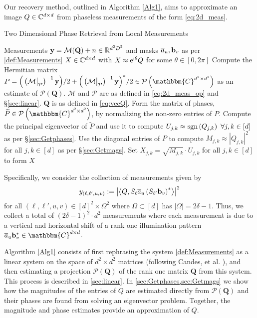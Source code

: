 Our recovery method, outlined in Algorithm \ref{Alg1}, aims to approximate an image $Q\in \mathbb{C}^{d\times d}$ from phaseless measurements of the form \eqref{eq:2d_meas}.
%
%
\begin{algorithm}[htbp]
\renewcommand{\algorithmicrequire}{\textbf{Input:}}
\renewcommand{\algorithmicensure}{\textbf{Output:}}
\caption{Two Dimensional Phase Retrieval from Local Measurements}
\label{Alg1}
\label{alg:2d_pr}
\begin{algorithmic}[1]
    \REQUIRE Measurements $\mathbf{y} = \mathcal{M}(\mathbf{Q}) + n \in \mathbb{R}^{d^2 D^2}$ and masks $\overline{a}_u, \mathbf b_v$ as per \eqref{def:Measurements}
    \ENSURE $X \in \mathbb{C}^{d \times d}$ with $X \approx \mathrm{e}^{\mathrm{i} \theta} Q$ for some $\theta \in [0, 2 \pi]$ 
    \STATE Compute the Hermitian matrix $P = \Big( \left(\mathcal{M} \big|_{\mathcal{P}}\right)^{-1} {\bf y}\Big)/2 + \Big( \left(\Mc \big|_{\mathcal{P}}\right)^{-1} {\bf y}\Big)^*/2  \in \mathcal{P}\left(\mathbbm{C}^{d^2\times d^2}\right)$ as an estimate of $\mathcal{P} \left( \mathbf{Q} \right)$.  $\mathcal{M}$ and $\mathcal{P}$ are as defined in \eqref{eq:2d_meas_op} and \S\ref{sec:linear}.  $\mathbf{Q}$ is as defined in \eqref{eq:vecQ}.
    \STATE Form the matrix of phases, $\widetilde{P} \in \mathcal{P}\left(\mathbbm{C}^{d^2\times d^2}\right)$, by normalizing the non-zero entries of $P$.
    \STATE Compute the principal eigenvector of $\widetilde{P}$ and use it to compute $U_{j,k} \approx \operatorname{sgn}\left( Q_{j,k}\right) ~\forall j,k \in [d]$ as per \S\ref{sec:Getphases}.
    \STATE Use the diagonal entries of $P$ to compute $M_{j,k} \approx \left| Q_{j,k} \right|^2$ for all $j,k \in [d]$ as per \S\ref{sec:Getmags}.
    \STATE Set $X_{j,k} = \sqrt{M_{j,k}} \cdot U_{j,k}$ for all $j,k \in [d]$ to form $X$
    \end{algorithmic}
\end{algorithm}
%
%
%
Specifically, we consider the collection of measurements given by 
\begin{equation}
y_{(\ell,\ell',u,v)} := \left| \left\langle Q, S_{\ell} \overline{a}_u \left(S_{\ell'} \mathbf b_v \right)^* \right\rangle \right|^2
\label{def:Measurements}
\end{equation}
for all $(\ell,\ell',u,v) \in [d]^2 \times\Omega^2$ where $\Omega \subset [d]$ has $|\Omega| = 2\delta-1$.  Thus, we collect a total of $(2\delta-1)^2 \cdot d^2 $ measurements where each measurement is due to a vertical and horizontal shift of a rank one illumination pattern $\a_u \b_v^* \in \mathbbm{C}^{d \times d}$.

Algorithm \ref{Alg1} consists of first rephrasing the system \eqref{def:Measurements} as a linear system on the space of $d^2 \times d^2$ matrices (following Candes, et al. \cite{candes2011phaselift}), and then estimating a projection $\mathcal{P}( \mathbf{Q})$ of the rank one matrix $\mathbf{Q}$ from this system.  This process is described in \cref{sec:linear}.  In \cref{sec:Getphases,sec:Getmags} we show how the magnitudes of the entries of $Q$ are estimated directly from $\mathcal{P}(\mathbf{Q})$ and their phases are found from solving an eigenvector problem.  Together, the magnitude and phase estimates provide an approximation of $Q$.

